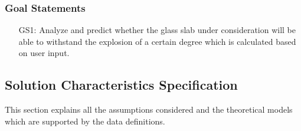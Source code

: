\documentclass[12pt]{article}
\begin{document}
\subsubsection{Goal Statements}
\label{Sec:GSs}
\begin{itemize}
\item[GS1:]Analyze and predict whether the glass slab under consideration will be able to withstand the explosion of a certain degree which is calculated based on user input.
\end{itemize}
\subsection{Solution Characteristics Specification}
\label{Sec:SCS}
This section explains all the assumptions considered and the theoretical models which are supported by the data definitions.
\end{document}

